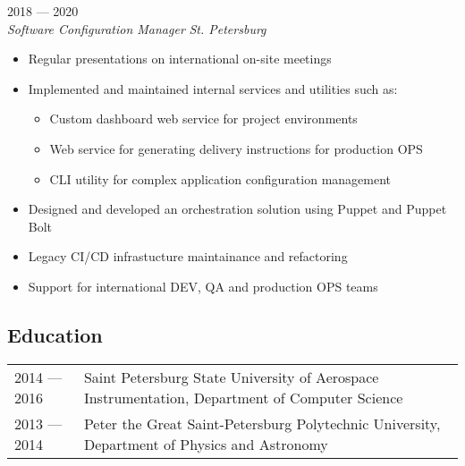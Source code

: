 \documentclass[11pt]{report}
\newenvironment{JobDescription}[4]{
    {\bf #1 } \hfill { #2}
    \\
    {\em #3 } \hfill {\em #4 }
    \begin{itemize}
} {
    \end{itemize}
}
\begin{document}
\begin{JobDescription}{}{2018 --- 2020}{Software Configuration Manager}{St. Petersburg}
    \item Regular presentations on international on-site meetings
    \item Implemented and maintained internal services and utilities such as:
    \begin{itemize}
        \item Custom dashboard web service for project environments
        \item Web service for generating delivery instructions for production OPS
        \item CLI utility for complex application configuration management
    \end{itemize}
    \item Designed and developed an orchestration solution using Puppet and Puppet Bolt
    \item Legacy CI/CD infrastucture maintainance and refactoring
    \item Support for international DEV, QA and production OPS teams
\end{JobDescription}

\subsection*{Education}
\begin{table}[H]
    \begin{tabular}{@{}p{}p{}}
        2014 --- 2016 & Saint Petersburg State University of Aerospace Instrumentation, Department of Computer Science \\
        2013 --- 2014 & Peter the Great Saint-Petersburg Polytechnic University, Department of Physics and Astronomy
    \end{tabular}
\end{table}

\goodbreak
\end{document}
